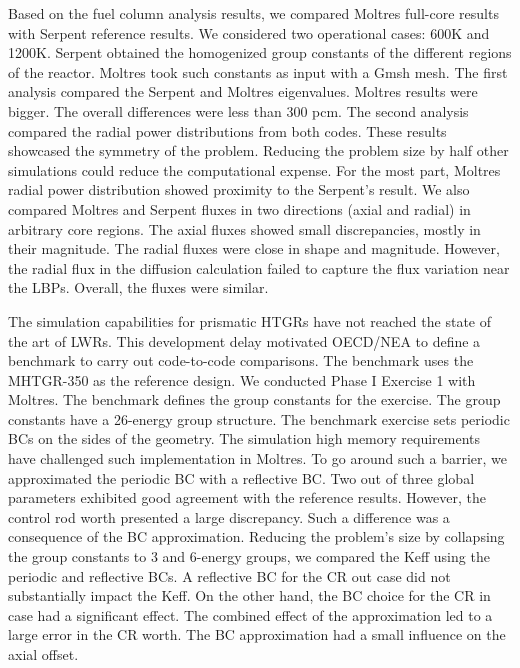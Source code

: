 \documentclass[11pt,letterpaper]{article}
\begin{document}
Based on the fuel column analysis results, we compared Moltres full-core results with Serpent reference results.
We considered two operational cases: 600K and 1200K.
Serpent obtained the homogenized group constants of the different regions of the reactor.
Moltres took such constants as input with a Gmsh mesh.
The first analysis compared the Serpent and Moltres eigenvalues.
Moltres results were bigger.
The overall differences were less than 300 pcm.
The second analysis compared the radial power distributions from both codes.
These results showcased the symmetry of the problem.
Reducing the problem size by half other simulations could reduce the computational expense.
For the most part, Moltres radial power distribution showed proximity to the Serpent's result.
We also compared Moltres and Serpent fluxes in two directions (axial and radial) in arbitrary core regions.
The axial fluxes showed small discrepancies, mostly in their magnitude.
The radial fluxes were close in shape and magnitude.
However, the radial flux in the diffusion calculation failed to capture the flux variation near the LBPs.
Overall, the fluxes were similar.

The simulation capabilities for prismatic HTGRs have not reached the state of the art of LWRs.
This development delay motivated OECD/NEA to define a benchmark to carry out code-to-code comparisons.
The benchmark uses the MHTGR-350 as the reference design.
We conducted Phase I Exercise 1 with Moltres.
The benchmark defines the group constants for the exercise.
The group constants have a 26-energy group structure.
The benchmark exercise sets periodic \glspl{BC} on the sides of the geometry.
The simulation high memory requirements have challenged such implementation in Moltres. 
To go around such a barrier, we approximated the periodic \gls{BC} with a reflective BC.
Two out of three global parameters exhibited good agreement with the reference results.
However, the control rod worth presented a large discrepancy.
Such a difference was a consequence of the BC approximation.
Reducing the problem's size by collapsing the group constants to 3 and 6-energy groups, we compared the \gls{Keff} using the periodic and reflective BCs.
A reflective BC for the \gls{CR} out case did not substantially impact the \gls{Keff}.
On the other hand, the BC choice for the CR in case had a significant effect.
The combined effect of the approximation led to a large error in the CR worth.
The BC approximation had a small influence on the axial offset.


\pagebreak


\end{document}

